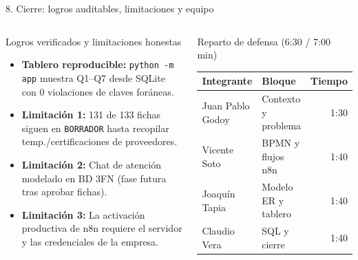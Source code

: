 \documentclass[aspectratio=169,10pt]{beamer}
\begin{document}
\begin{frame}{8. Cierre: logros auditables, limitaciones y equipo}
\begin{columns}[T]
\begin{block}{Logros verificados y limitaciones honestas}
\footnotesize
\begin{itemize}
    \item \textbf{Tablero reproducible:} \texttt{python -m app} muestra Q1--Q7 desde SQLite con 0 violaciones de claves foráneas.
    \item \textbf{Limitación 1:} 131 de 133 fichas siguen en \texttt{BORRADOR} hasta recopilar temp./certificaciones de proveedores.
    \item \textbf{Limitación 2:} Chat de atención modelado en BD 3FN (fase futura tras aprobar fichas).
    \item \textbf{Limitación 3:} La activación productiva de n8n requiere el servidor y las credenciales de la empresa.
\end{itemize}
\end{block}
\begin{block}{Reparto de defensa (6:30 / 7:00 min)}
\scriptsize
\begin{tabular}{llr}
\toprule
\textbf{Integrante} & \textbf{Bloque} & \textbf{Tiempo} \\
\midrule
Juan Pablo Godoy & Contexto y problema & 1:30 \\
Vicente Soto & BPMN y flujos n8n & 1:40 \\
Joaquín Tapia & Modelo ER y tablero & 1:40 \\
Claudio Vera & SQL y cierre & 1:40 \\
\bottomrule
\end{tabular}
\end{block}
\end{columns}
\end{frame}
\end{document}
